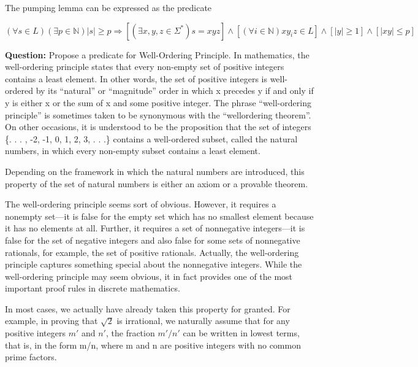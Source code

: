 \documentclass{article}
\begin{document}
The pumping lemma can be expressed as the predicate

\begin{equation*}
  (\forall s \in L)(\exists p \in \mathbb{N})\left\lvert s \right\rvert \geq  p \Longrightarrow 
  [(\exists x, y, z \in \Sigma^*)s = xyz] \land [(\forall i \in \mathbb{N})xy_iz \in L] \land [\left\lvert y \right\rvert \geq 1] \land [\left\lvert xy \right\rvert \leq p]
\end{equation*}

\begin{tcolorbox}
  \textbf{Question:} Propose a predicate for Well-Ordering Principle. In mathematics, the well-ordering principle states that every non-empty set of positive integers contains a least element. In other words, the set of positive integers is well-ordered by its “natural” or “magnitude” order in which x precedes y if and only if y is either x or the sum of x and some positive integer. The phrase “well-ordering principle” is sometimes taken to be synonymous with the “wellordering theorem”. On other occasions, it is understood to be the proposition that the set of integers \{. . . , -2, -1, 0, 1, 2, 3, . . .\} contains a well-ordered subset, called the natural numbers, in which every non-empty subset contains a least element.
\end{tcolorbox}

\begin{tcolorbox}
  Depending on the framework in which the natural numbers are introduced, this property of the set of natural numbers is either an axiom or a provable theorem.

  The well-ordering principle seems sort of obvious. However, it requires a nonempty set—it is false for the empty set which has no smallest element because it has no elements at all. Further, it requires a set of nonnegative integers—it is false for the set of negative integers and also false for some sets of nonnegative rationals, for example, the set of positive rationals. Actually, the well-ordering principle captures something special about the nonnegative integers. While the well-ordering principle may seem obvious, it in fact provides one of the most important proof rules in discrete mathematics.

  In most cases, we actually have already taken this property for granted. For example, in proving that $\sqrt{2} $ is irrational, we naturally assume that for any positive integers $m\prime $ and $n\prime$, the fraction $m\prime / n\prime$ can be written in lowest terms, that is, in the form m/n, where m and n are positive integers with no common prime factors.
\end{tcolorbox}
\end{document}
